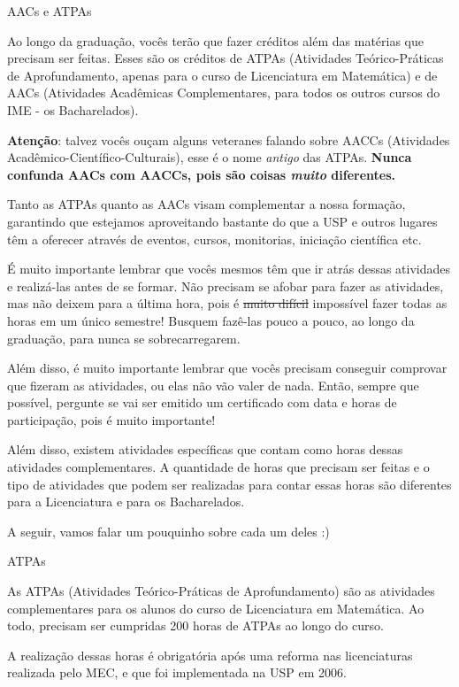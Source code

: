 \begin{secao}{AACs e ATPAs}

Ao longo da graduação, vocês terão que fazer créditos além das matérias
que precisam ser feitas. Esses são os créditos de ATPAs (Atividades
Teórico-Práticas de Aprofundamento, apenas para o curso de Licenciatura
em Matemática) e de AACs (Atividades Acadêmicas Complementares, para todos
os outros cursos do IME - os Bacharelados).

\textbf{Atenção}: talvez vocês ouçam
alguns veteranes falando sobre AACCs (Atividades Acadêmico-Científico-Culturais),
esse é o nome \textit{antigo} das ATPAs.
\textbf{Nunca confunda AACs com AACCs, pois são coisas \textit{muito} diferentes.}

Tanto as ATPAs quanto as AACs visam complementar a nossa formação,
garantindo que estejamos aproveitando bastante do que a USP e outros
lugares têm a oferecer através de eventos, cursos, monitorias, iniciação
científica etc.

É muito importante lembrar que vocês mesmos têm que ir atrás dessas
atividades e realizá-las antes de se formar. Não precisam se afobar para
fazer as atividades, mas não deixem para a última hora, pois é
\sout{muito difícil} impossível fazer todas as horas em um único semestre!
Busquem fazê-las pouco a pouco, ao longo da graduação, para nunca se
sobrecarregarem.

Além disso, é muito importante lembrar que vocês precisam conseguir
comprovar que fizeram as atividades, ou elas não vão valer de nada.
Então, sempre que possível, pergunte se vai ser emitido um certificado
com data e horas de participação, pois é muito importante!

Além disso, existem atividades específicas que contam como horas
dessas atividades complementares. A quantidade de horas que precisam
ser feitas e o tipo de atividades que podem ser realizadas para contar
essas horas são diferentes para a Licenciatura e para os Bacharelados.

A seguir, vamos falar um pouquinho sobre cada um deles :)

\begin{subsecao}{ATPAs}

As ATPAs (Atividades Teórico-Práticas de Aprofundamento) são as
atividades complementares para os alunos do curso de Licenciatura em
Matemática. Ao todo, precisam ser cumpridas 200 horas de ATPAs ao longo do curso.

A realização dessas horas é obrigatória após uma reforma nas licenciaturas
realizada pelo MEC, e que foi implementada na USP em 2006.


\end{subsecao}
\end{secao}
